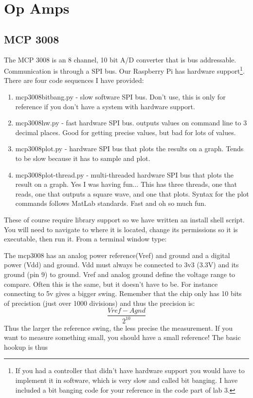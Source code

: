 \chapter{Op Amps}

\section{MCP 3008}

The MCP 3008 is an 8 channel, 10 bit A/D converter that is bus addressable.  Communication is through a SPI bus.  Our Raspberry Pi has hardware support\footnote{If you had a controller that didn't have hardware support you would have to implement it in software, which is very slow and called bit banging.  I have included a bit banging code for your reference in the code part of lab 3.}.  There are four code sequences I have provided:
\begin{enumerate}
\item mcp3008bitbang.py - slow software SPI bus.  Don't use, this is only for reference if you don't have a system with hardware support.
\item mcp3008hw.py - fast hardware SPI bus.  outputs values on command line to 3 decimal places.  Good for getting precise values, but bad for lots of values.
\item mcp3008plot.py - hardware SPI bus that plots the results on a graph.  Tends to be slow because it has to sample and plot.
\item mcp3008plot-thread.py - multi-threaded hardware SPI bus that plots the result on a graph.  Yes I was having fun...  This has three threads, one that reads, one that outputs a square wave, and one that plots.  Syntax for the plot commands follows MatLab standards.  Fast and oh so much fun.
\end{enumerate}
These of course require library support so we have written an install shell script.  You will need to navigate to where it is located, change its permissions so it is executable, then run it.  From a terminal window type:




The mcp3008 has an analog power reference(Vref) and ground and a digital power (Vdd) and ground.  Vdd must always be connected to 3v3 (3.3V) and its ground (pin 9) to ground.  Vref and analog ground define the voltage range to compare.  Often this is the same, but it doesn't have to be.  For instance connecting to 5v gives a bigger swing.  Remember that the chip only has 10 bits of precistion (just over 1000 divisions) and thus the precision is:
$$
\frac{Vref-Agnd}{2^{10}}
$$
Thus the larger the reference swing, the less precise the measurement.  If you want to measure something small, you should have a small reference!  The basic hookup is thus

